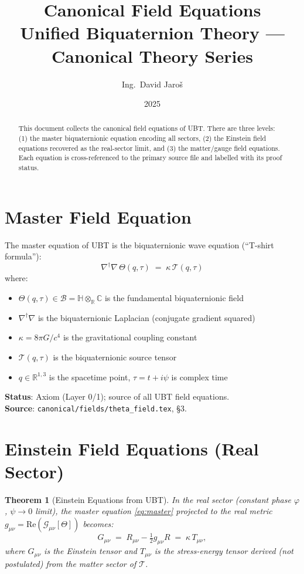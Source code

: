 \documentclass[11pt,a4paper]{article}
\title{Canonical Field Equations\\
\large Unified Biquaternion Theory — Canonical Theory Series}
\author{Ing.\ David Jaroš}
\date{2025}
\newtheorem{theorem}{Theorem}
\begin{document}
\maketitle

\begin{abstract}
This document collects the canonical field equations of UBT. There are three
levels: (1) the master biquaternionic equation encoding all sectors,
(2) the Einstein field equations recovered as the real-sector limit,
and (3) the matter/gauge field equations. Each equation is cross-referenced
to the primary source file and labelled with its proof status.
\end{abstract}

\section{Master Field Equation}

The master equation of UBT is the biquaternionic wave equation
(``T-shirt formula''):
\begin{equation}\label{eq:master}
  \boxed{
    \nabla^\dagger\nabla\,\Theta(q,\tau)
    \;=\;
    \kappa\,\mathcal{T}(q,\tau)
  }
\end{equation}
where:
\begin{itemize}
  \item $\Theta(q,\tau) \in \mathcal{B} = \mathbb{H}\otimes_\mathbb{R}\mathbb{C}$
        is the fundamental biquaternionic field
  \item $\nabla^\dagger\nabla$ is the biquaternionic Laplacian
        (conjugate gradient squared)
  \item $\kappa = 8\pi G/c^4$ is the gravitational coupling constant
  \item $\mathcal{T}(q,\tau)$ is the biquaternionic source tensor
  \item $q \in \mathbb{R}^{1,3}$ is the spacetime point,
        $\tau = t + i\psi$ is complex time
\end{itemize}

\noindent\textbf{Status}: Axiom (Layer 0/1); source of all UBT field equations.\\
\noindent\textbf{Source}: \texttt{canonical/fields/theta\_field.tex}, \S3.

\section{Einstein Field Equations (Real Sector)}

\begin{theorem}[Einstein Equations from UBT]
In the real sector (constant phase $\varphi$, $\psi \to 0$ limit), the master
equation \eqref{eq:master} projected to the real metric
$g_{\mu\nu} = \mathrm{Re}(\mathcal{G}_{\mu\nu}[\Theta])$ becomes:
\begin{equation}\label{eq:Einstein}
  G_{\mu\nu}
  \;=\;
  R_{\mu\nu} - \tfrac{1}{2}g_{\mu\nu}R
  \;=\;
  \kappa\,T_{\mu\nu},
\end{equation}
where $G_{\mu\nu}$ is the Einstein tensor and $T_{\mu\nu}$ is the
stress-energy tensor derived (not postulated) from the matter sector of
$\mathcal{T}$.
\end{theorem}
\end{document}
